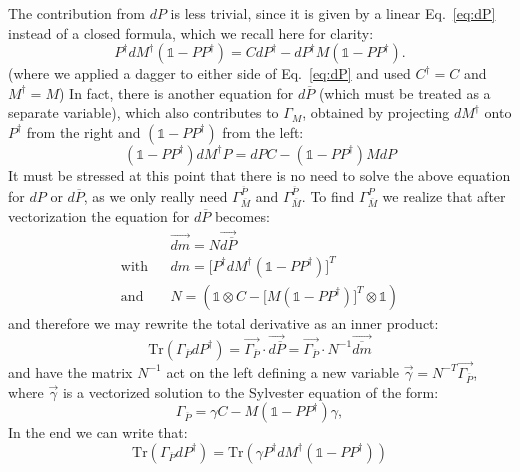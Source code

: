 \documentclass[twocolumn,floatfix,superscriptaddress,longbibliography,pra]{revtex4-2}
\begin{document}
The contribution from $dP$ is less trivial, since it is given by a linear Eq.~\eqref{eq:dP} instead of a closed formula, which we recall here for clarity:
\begin{equation}
    P^\dagger dM^\dagger (\mathbb{1} - PP^\dagger) = C dP^\dagger - dP^\dagger M (\mathbb{1} - PP^\dagger).
\end{equation}
(where we applied a dagger to either side of Eq.~\eqref{eq:dP} and used $C^\dagger=C$ and $M^\dagger=M$)
In fact, there is another equation for $d\overline{P}$ (which must be treated as a separate variable), which also contributes to $\Gamma_M$, obtained by projecting $dM^\dagger$ onto $P^\dagger$ from the right and $(\mathbb{1}-PP^\dagger)$ from the left:
\begin{equation}
    (\mathbb{1} - PP^\dagger) dM^\dagger P =dP C - (\mathbb{1} - PP^\dagger)M dP
\end{equation}
It must be stressed at this point that there is no need to solve the above equation for $dP$ or $d\overline{P}$, as we only really need $\Gamma^{\overline{P}}_{\overline{M}}$ and $\Gamma^{\overline{P}}_{\overline{M}}$. To find $\Gamma^P_{\overline{M}}$ we realize that after vectorization the equation for $d\overline{P}$ becomes:
\begin{eqnarray}
   &&\overrightarrow{dm} =   N \overrightarrow{d\overline{P}} \\
\text{with} &&   dm = \Big[P^\dagger dM^\dagger \left(\mathbb{1}-PP^\dagger\right)\Big]^T \\
\text{and} && N = \left( \mathbb{1}\otimes C-\big[M(\mathbb{1}-PP^\dagger)\big]^T\otimes \mathbb{1} \right)
\end{eqnarray}
and therefore we may rewrite the total derivative as an inner product:
\begin{equation}
    \text{Tr}\left(\Gamma_{\overline{P}} dP^\dagger \right) = \vec{\Gamma_{\overline{P}}}\cdot \vec{d{\overline{P}}} = \vec{\Gamma_{\overline{P}}}\cdot N^{-1} \vec{\overline{dm}}
\end{equation}
and have the matrix $N^{-1}$ act on the left defining a new variable $\vec{\gamma}=N^{-T}\vec{\Gamma_{\overline{P}}} $, where $\vec{\gamma}$ is a vectorized solution to the Sylvester equation of the form:
\begin{equation}
    \Gamma_{\overline{P}} = \gamma C - M(\mathbb{1} - PP^\dagger) \gamma, \label{eq:GammaM}
\end{equation}
In the end we can write that:
\begin{equation}
    \text{Tr}\left(\Gamma_{\overline{P}} dP^\dagger \right) = \text{Tr}\left(\gamma P^\dagger dM^\dagger (\mathbb{1}-PP^\dagger) \right)
\end{equation}
\end{document}
